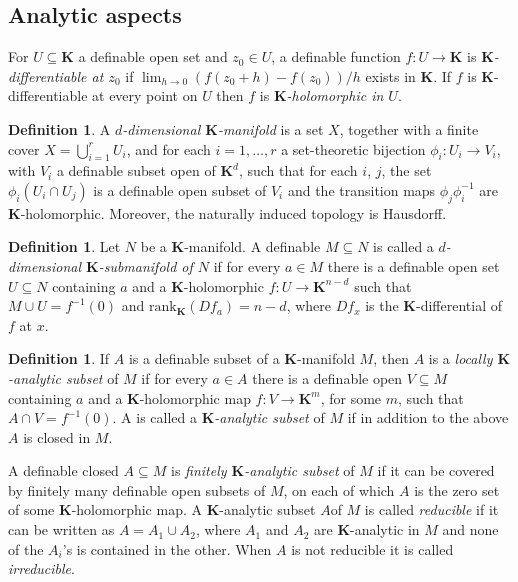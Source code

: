 \documentclass{amsart}
\theoremstyle{definition}
\newtheorem{definition}[theorem]{Definition}
\numberwithin{equation}{section}
\begin{document}
\subsection{Analytic aspects}
For $U \subseteq \mathbf{K}$ a definable open set and $z_0 \in U$,
a definable function $f: U \to \mathbf{K}$ is \emph{$\mathbf{K}$-differentiable at $z_0$} if $\lim_{h\to 0}(f(z_0+h) - f(z_0))/h$ exists in $\mathbf{K}$.
If $f$ is $\mathbf{K}$-differentiable at every point on $U$ then
$f$ is \emph{$\mathbf{K}$-holomorphic in $U$}.

\begin{definition}
  A \emph{$d$-dimensional $\mathbf{K}$-manifold} is a set $X$,
  together with a finite cover $X = \bigcup_{i=1}^r U_i$,
  and for each $i = 1,\dots,r$ a set-theoretic bijection $\phi_i: U_i \to V_i$,
  with $V_i$ a definable subset open of $\mathbf{K}^d$,
  such that for each $i$, $j$,
  the set $\phi_i(U_i \cap U_j)$ is a definable open subset of $V_i$ and the transition maps $\phi_j \phi_i^{-1}$ are $\mathbf{K}$-holomorphic.
  Moreover, the naturally induced topology is Hausdorff.
\end{definition}

\begin{definition}
  Let $N$ be a $\mathbf{K}$-manifold.
  A definable $M \subseteq N$ is called a \emph{$d$-dimensional $\mathbf{K}$-submanifold of $N$} if for every $a\in M$ there is a definable open set $U \subseteq N$ containing $a$ and a $\mathbf{K}$-holomorphic $f: U \to \mathbf{K}^{n-d}$ such that $M \cup U = f^{-1}(0)$ and $\mathrm{rank}_{\mathbf{K}}(Df_a) = n-d$,
  where $Df_x$ is the $\mathbf{K}$-differential of $f$ at $x$.
\end{definition}

\begin{definition}
  If $A$ is a definable subset of a $\mathbf{K}$-manifold $M$,
  then $A$ is a \emph{locally $\mathbf{K}$-analytic subset} of $M$
  if for every $a\in A$ there is a definable open $V \subseteq M$ containing $a$ and a $\mathbf{K}$-holomorphic map $f : V \to \mathbf{K}^m$,
  for some $m$, such that $A\cap V= f^{-1}(0)$.
  A is called a \emph{$\mathbf{K}$-analytic subset} of $M$ if in addition to the above $A$ is closed in $M$.

  A definable closed $A \subseteq M$ is \emph{finitely $\mathbf{K}$-analytic subset} of $M$ if it can be covered by finitely many definable open subsets of $M$,
  on each of which $A$ is the zero set of some $\mathbf{K}$-holomorphic map.
  A $\mathbf{K}$-analytic subset $A $of $M$ is called \emph{reducible} if it can be written as $A= A_1 \cup A_2$,
  where $A_1$ and $A_2$ are $\mathbf{K}$-analytic in $M$ and none of the $A_i$'s is contained in the other.
  When $A$ is not reducible it is called \emph{irreducible}.
\end{definition}
\end{document}

